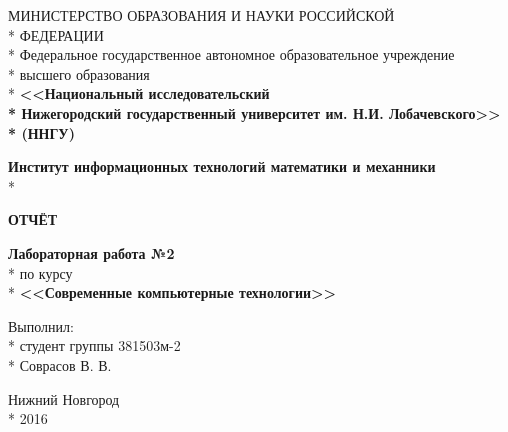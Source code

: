 \begin{titlepage}

\begin{center}
\fontsize{16pt}{16pt}МИНИСТЕРСТВО ОБРАЗОВАНИЯ И НАУКИ РОССИЙСКОЙ\\*
ФЕДЕРАЦИИ \\*
\fontsize{16pt}{0pt}Федеральное государственное автономное образовательное учреждение\\*
высшего образования \\*
\fontsize{16pt}{16pt}\textbf{<<Национальный исследовательский \\*
Нижегородский государственный университет им. Н.И. Лобачевского>>\\*
(ННГУ)}
\end{center}

\vspace{12pt}

\begin{center}
\fontsize{16pt}{0pt}\textbf{Институт информационных технологий математики и механники} \\*
\end{center}

\vspace{50pt}

\vspace{45pt}

\begin{center}
\fontsize{18pt}{0pt}\textbf{ОТЧЁТ}
\end{center}

\begin{center}
\fontsize{16pt}{0pt}\textbf{Лабораторная работа №2} \\*
по курсу \\*
\textbf{<<Современные компьютерные технологии>>}
\end{center}

\vspace{80pt}

\begin{flushright}
Выполнил:  \\*
студент группы 381503м-2  \\*
Соврасов В. В. 
\end{flushright}


\vspace{\fill}

\begin{center}
Нижний Новгород \\*
2016
\end{center}

\end{titlepage}
